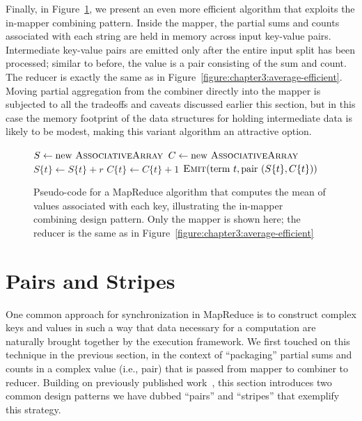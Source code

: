 Finally, in Figure~\ref{figure:chapter3:average-more-efficient}, we
present an even more efficient algorithm that exploits the in-mapper
combining pattern.  Inside the mapper, the partial sums and counts
associated with each string are held in memory across input key-value
pairs.  Intermediate key-value pairs are emitted only after the entire
input split has been processed; similar to before, the value is a pair
consisting of the sum and count.  The reducer is exactly the same as
in Figure~\ref{figure:chapter3:average-efficient}.  Moving partial
aggregation from the combiner directly into the mapper is subjected to
all the tradeoffs and caveats discussed earlier this section, but in
this case the memory footprint of the data structures for holding
intermediate data is likely to be modest, making this variant
algorithm an attractive option.

\begin{figure}[t]
\algrenewcommand{}
\algrenewcommand{}
  \begin{algorithmic}[1]
      \State $S \gets \textrm{new }\textsc{AssociativeArray}$
      \State $C \gets \textrm{new }\textsc{AssociativeArray}$
    \EndProcedure
      \State $S\{t\} \gets S\{t\} + r$
      \State $C\{t\} \gets C\{t\} + 1$
    \EndProcedure
      \State $\textsc{Emit}(\textrm{term }t, \textrm{pair }(S\{t\}, C\{t\}))$
    \EndFor
    \EndProcedure
    \EndFunction
  \end{algorithmic}
  \caption{Pseudo-code for a MapReduce algorithm that computes the
    mean of values associated with each key, illustrating the
    in-mapper combining design pattern.  Only the mapper is shown
    here; the reducer is the same as in
    Figure~\ref{figure:chapter3:average-efficient}}
\label{figure:chapter3:average-more-efficient}
\end{figure}

\section{Pairs and Stripes}
\label{chapter3:pairs-and-stripes}

One common approach for synchronization in MapReduce is to construct
complex keys and values in such a way that data necessary for a
computation are naturally brought together by the execution framework.
We first touched on this technique in the previous section, in the
context of ``packaging'' partial sums and counts in a complex value
(i.e., pair) that is passed from mapper to combiner to reducer.
Building on previously published
work~\cite{Dyer_etal_2008,Lin_EMNLP2008}, this section introduces two
common design patterns we have dubbed ``pairs'' and ``stripes'' that
exemplify this strategy.

